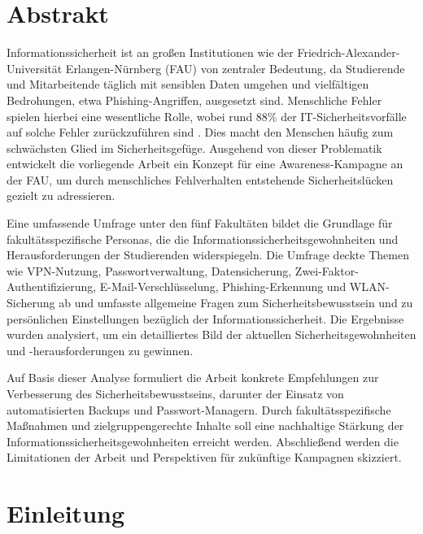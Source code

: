\documentclass[german,report]{i1thesis}
\begin{document}
\makethetitle

\newpage

\section*{Abstrakt}
Informationssicherheit ist an großen Institutionen wie der Friedrich-Alexander-Universität Erlangen-Nürnberg (FAU) von zentraler Bedeutung, da Studierende und Mitarbeitende täglich mit sensiblen Daten umgehen und vielfältigen Bedrohungen, etwa Phishing-Angriffen, ausgesetzt sind. Menschliche Fehler spielen hierbei eine wesentliche Rolle, wobei rund 88\% der IT-Sicherheitsvorfälle auf solche Fehler zurückzuführen sind \cite{sebastian2021rethinking}. Dies macht den Menschen häufig zum schwächsten Glied im Sicherheitsgefüge. Ausgehend von dieser Problematik entwickelt die vorliegende Arbeit ein Konzept für eine Awareness-Kampagne an der FAU, um durch menschliches Fehlverhalten entstehende Sicherheitslücken gezielt zu adressieren.

Eine umfassende Umfrage unter den fünf Fakultäten bildet die Grundlage für fakultätsspezifische Personas, die die Informationssicherheitsgewohnheiten und Herausforderungen der Studierenden widerspiegeln. Die Umfrage deckte Themen wie VPN-Nutzung, Passwortverwaltung, Datensicherung, Zwei-Faktor-Authentifizierung, E-Mail-Verschlüsselung, Phishing-Erkennung und WLAN-Sicherung ab und umfasste allgemeine Fragen zum Sicherheitsbewusstsein und zu persönlichen Einstellungen bezüglich der Informationssicherheit. Die Ergebnisse wurden analysiert, um ein detailliertes Bild der aktuellen Sicherheitsgewohnheiten und -herausforderungen zu gewinnen.

Auf Basis dieser Analyse formuliert die Arbeit konkrete Empfehlungen zur Verbesserung des Sicherheitsbewusstseins, darunter der Einsatz von automatisierten Backups und Passwort-Managern. Durch fakultätsspezifische Maßnahmen und zielgruppengerechte Inhalte soll eine nachhaltige Stärkung der Informationssicherheitsgewohnheiten erreicht werden. Abschließend werden die Limitationen der Arbeit und Perspektiven für zukünftige Kampagnen skizziert.
\newpage

\maketoc

\newpage

\section{Einleitung}
\label{sec:introduction}
\end{document}
